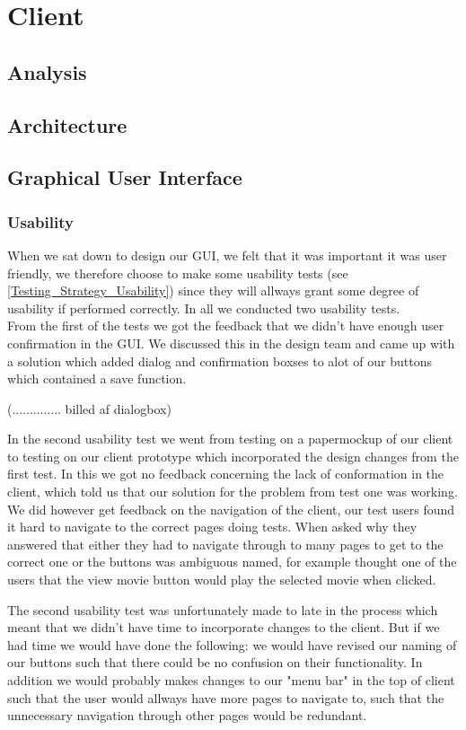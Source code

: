 \section{Client}
\label{Design_Client}

\subsection{Analysis}
\label{Design_Client_Analysis}

\subsection{Architecture}
\label{Design_Client_Architecture}

\subsection{Graphical User Interface}
\label{Design_Client_GUI}

\subsubsection{Usability}
\label{Design_Client_GUI_Usability}
When we sat down to design our GUI, we felt that it was important it was user friendly, we therefore choose to make some usability tests (see \ref{Testing_Strategy_Usability}) since they will allways grant some degree of usability if performed correctly. In all we conducted two usability tests.
\\From the first of the tests we got the feedback that we didn't have enough user confirmation in the GUI. We discussed this in the design team and came up with a solution which added dialog and confirmation boxses to alot of our buttons which contained a save function.

(.............. billed af dialogbox)

In the second usability test we went from testing on a papermockup of our client to testing on our client prototype which incorporated the design changes from the first test. In this we got no feedback concerning the lack of conformation in the client, which told us that our solution for the problem from test one was working. We did however get feedback on the navigation of the client, our test users found it hard to navigate to the correct pages doing tests. When asked why they answered that either they had to navigate through to many pages to get to the correct one or the buttons was ambiguous named, for example thought one of the users that the view movie button would play the selected movie when clicked.

The second usability test was unfortunately made to late in the process which meant that we didn't have time to incorporate changes to the client. But if we had time we would have done the following: we would have revised our naming of our buttons such that there could be no confusion on their functionality. In addition we would probably makes changes to our "menu bar" in the top of client such that the user would allways have more pages to navigate to, such that the unnecessary navigation through other pages would be redundant.
